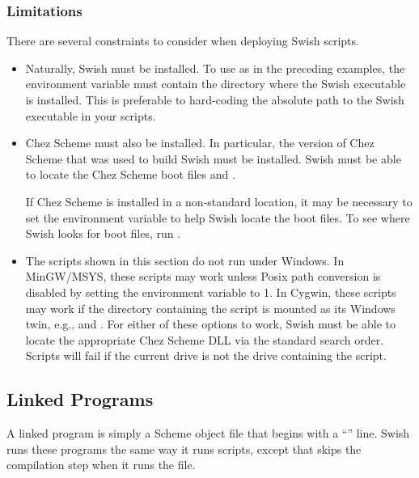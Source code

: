 
\subsubsection {Limitations}\label{sec:script-limitations}

There are several constraints to consider when deploying Swish scripts. 
\begin{itemize}
  \item
    Naturally, Swish must be installed.
    To use  as in the preceding examples, the 
    environment variable must contain the directory where the Swish executable
    is installed.
    This is preferable to hard-coding the absolute path to the Swish executable
    in your scripts.
  \item
    Chez Scheme must also be installed.
    In particular, the version of Chez Scheme that was used to build Swish
    must be installed.
    Swish must be able to locate the Chez Scheme boot files 
    and .

    If Chez Scheme is installed in a non-standard location, it may be
    necessary to set the  environment variable
    to help Swish locate the boot files.
    To see where Swish looks for boot files, run .
  \item
    The \code{\#!} scripts shown in this section do not run under Windows.
    In MinGW/MSYS, these scripts may work unless Posix path conversion is
    disabled by setting the  environment variable to 1.
    In Cygwin, these scripts may work if the directory containing the script
    is mounted as its Windows twin, e.g.,  and .
    For either of these options to work, Swish must be able to locate the
    appropriate Chez Scheme DLL via the standard search order.
    Scripts will fail if the current drive is not the drive containing the script.
\end{itemize}

\subsection {Linked Programs}

A linked program is simply a Scheme object file that begins
with a ``'' line.
Swish runs these programs the same way it runs scripts,
except that  skips the compilation step
when it runs the file.

